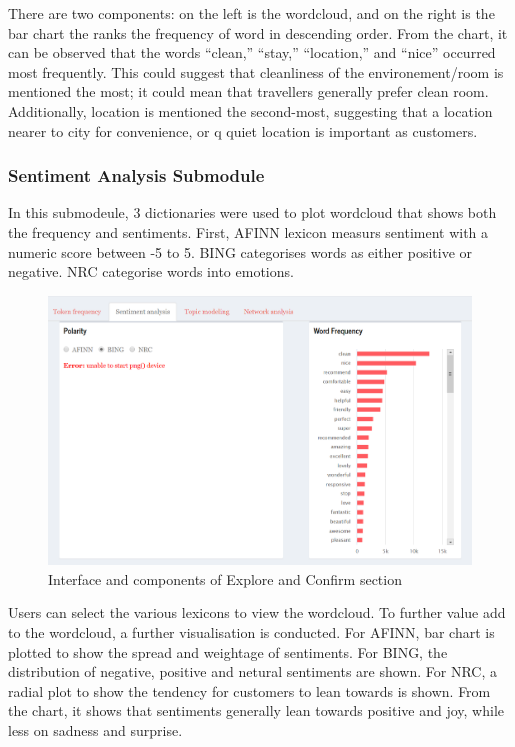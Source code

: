 \documentclass{acm_proc_article-sp}
\begin{document}
There are two components: on the left is the wordcloud, and on the right
is the bar chart the ranks the frequency of word in descending order.
From the chart, it can be observed that the words ``clean,'' ``stay,''
``location,'' and ``nice'' occurred most frequently. This could suggest
that cleanliness of the environement/room is mentioned the most; it
could mean that travellers generally prefer clean room. Additionally,
location is mentioned the second-most, suggesting that a location nearer
to city for convenience, or q quiet location is important as customers.

\hypertarget{sentiment-analysis-submodule}{%
\subsubsection{Sentiment Analysis
Submodule}\label{sentiment-analysis-submodule}}

In this submodeule, 3 dictionaries were used to plot wordcloud that
shows both the frequency and sentiments. First, AFINN lexicon measurs
sentiment with a numeric score between -5 to 5. BING categorises words
as either positive or negative. NRC categorise words into emotions.

\begin{figure}[H]

{\centering \includegraphics[width=1\linewidth]{images/sentimentanalysis} 

}

\caption{Interface and components of Explore and Confirm section}\label{fig:unnamed-chunk-6}
\end{figure}

Users can select the various lexicons to view the wordcloud. To further
value add to the wordcloud, a further visualisation is conducted. For
AFINN, bar chart is plotted to show the spread and weightage of
sentiments. For BING, the distribution of negative, positive and netural
sentiments are shown. For NRC, a radial plot to show the tendency for
customers to lean towards is shown. From the chart, it shows that
sentiments generally lean towards positive and joy, while less on
sadness and surprise.
\end{document}
